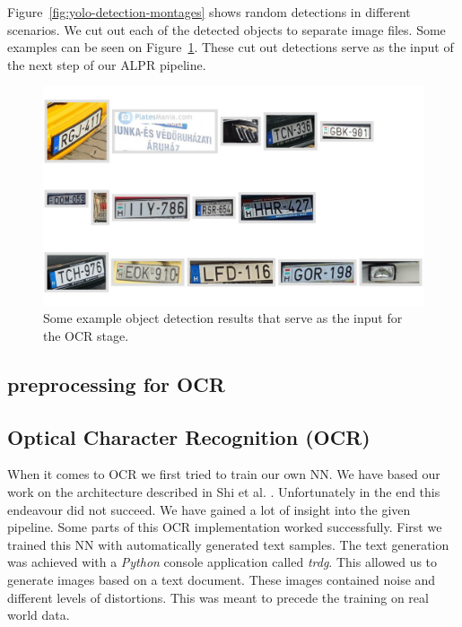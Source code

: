 Figure~\ref{fig:yolo-detection-montages}  shows random detections in different
scenarios. We cut out each of the detected objects to separate image files. Some
examples can be seen on Figure~\ref{fig:cutout-montage}.
These cut out detections serve as the input of the next step of our \ac{ALPR}
pipeline.
\begin{figure}
    \includegraphics[width=\textwidth]{figures/yolo/cutout_montage.jpg}
    \caption{Some example object detection results that serve as the
    input for the OCR stage.}
    \label{fig:cutout-montage}
\end{figure}
\subsection{preprocessing for OCR}



\subsection{Optical Character Recognition (OCR)}

When it comes to \ac{OCR} we first tried to train our own \ac{NN}.
We have based our work on the architecture described in Shi et al. \cite{7801919}.
Unfortunately in the end this endeavour did not succeed.
We have gained a lot of insight into the given pipeline.
Some parts of this \ac{OCR} implementation worked successfully.
First we trained this \ac{NN} with automatically generated text samples.
The text generation was achieved with a \emph{Python} console application called \emph{trdg}.
This allowed us to generate images based on a text document.
These images contained noise and different levels of distortions.
This was meant to precede the training on real world data.

